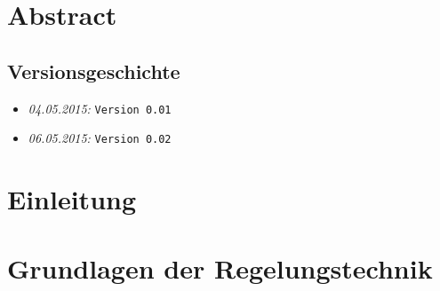 \documentclass{fhnwreport/fhnwreport}
\begin{document}



\section*{Abstract}
\label{sec:abstract}



\clearpage




\tableofcontents

\vspace{40mm}
\subsection*{Versionsgeschichte}
\begin{itemize}
    \item[]
        \emph{04.05.2015:} \texttt{Version 0.01}
    \item[]
        \emph{06.05.2015:} \texttt{Version 0.02}
\end{itemize}
\clearpage



\clearpage
\section{Einleitung}
\label{sec:einleitung}



\clearpage
\section{Grundlagen der Regelungstechnik}
\label{sec:grundlagenRegtech}

\end{document}
